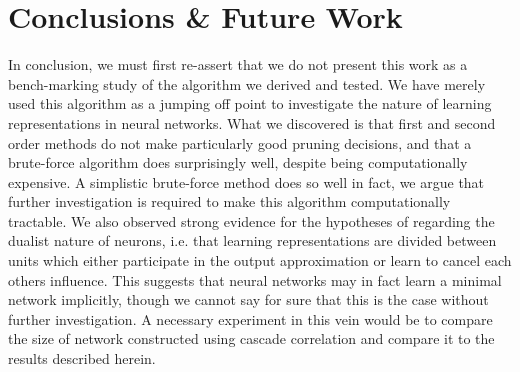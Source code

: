 \section{Conclusions \& Future Work}
In conclusion, we must first re-assert that we do not present this work as a bench-marking study of the algorithm we derived and tested. We have merely used this algorithm as a jumping off point to investigate the nature of learning representations in neural networks. What we discovered is that first and second order methods do not make particularly good pruning decisions, and that a brute-force algorithm does surprisingly well, despite being computationally expensive. A simplistic brute-force method does so well in fact, we argue that further investigation is required to make this algorithm computationally tractable. We also observed strong evidence for the hypotheses of \cite{mozer1989skeletonization} regarding the dualist nature of neurons, i.e. that learning representations are divided between units which either participate in the output approximation or learn to cancel each others influence. This suggests that neural networks may in fact learn a minimal network implicitly, though we cannot say for sure that this is the case without further investigation. A necessary experiment in this vein would be to compare the size of network constructed using cascade correlation and compare it to the results described herein. 

